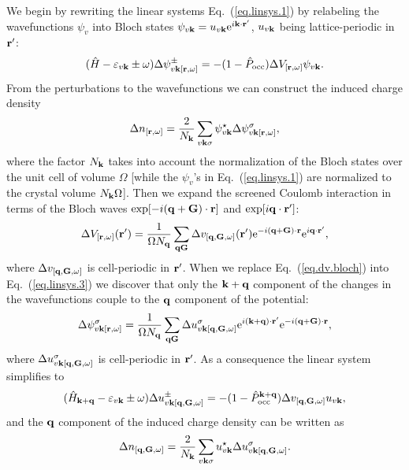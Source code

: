 \documentclass[twocolumn,prb,showpacs,superscriptaddress]{revtex4}
\def\w{\omega}
\def\H{\hat{H}}
\def\P{\hat{P}_{\rm occ}}
\def\E{\varepsilon}
\def\q{{\bf q}}
\def\s{\sigma}
\def\k{{\bf k}}
\def\G{{\bf G}}
\def\r{{\bf r}}
\def\rp{{\bf r^\prime}}
\begin{document}
We begin by rewriting 
the linear systems Eq.\ (\ref{eq.linsys.1})
by relabeling the wavefunctions $\psi_v$ into Bloch states
$\psi_{v\k}=u_{v\k} {\rm e}^{i\k\cdot\rp}$, $u_{v\k}$ being
lattice-periodic in $\rp$:
  \begin{equation}\label{eq.linsys.3}
  (\H-\E_{v\k}\pm\w) \Delta \psi^\pm_{v\k[\r,\w]}  = -(1-\P)  \Delta V_{[\r,\w]} \psi_{v\k}.
  \end{equation}
From the perturbations to the wavefunctions we can construct the
induced charge density
  \begin{equation}\label{eq.ch}
  \Delta n_{[\r,\w]} = \frac{2}{N_\k}\sum_{v\k\s} \psi_{v\k}^\star  \Delta \psi^\s_{v\k[\r,\w]},
  \end{equation}
where the factor $N_\k$ takes into account the normalization of
the Bloch states over the unit cell of volume $\Omega$
[while the $\psi_v$'s in Eq.\ (\ref{eq.linsys.1}) are normalized to the crystal volume
$N_\k \Omega$].
Then we expand the screened Coulomb interaction in terms
of the Bloch waves ${\rm exp}[-i(\q+\G)\cdot\r]$ and ${\rm exp}[i\q\cdot\rp]$:
  \begin{equation}\label{eq.dv.bloch}
  \Delta V_{[\r,\w]} (\rp) = \frac{1}{\Omega N_\q}  \sum_{\q\G} \Delta v_{[\q,\G,\w]}(\rp) 
   {\rm e}^{-i(\q+\G)\cdot\r} {\rm e}^{i\q\cdot\rp}, 
  \end{equation}
where $\Delta v_{[\q,\G,\w]}$ is cell-periodic in $\rp$.
When we replace Eq.\ (\ref{eq.dv.bloch}) into Eq.\ (\ref{eq.linsys.3})
we discover that only the $\k+\q$ component of the changes in the wavefunctions
couple to the $\q$ component of the potential:
  \begin{equation}
  \Delta \psi^\sigma_{v\k[\r,\w]} = \frac{1}{\Omega N_\q} \sum_{\q\G} \Delta u^\sigma_{v\k[\q,\G,\w]} 
  {\rm e}^{i(\k+\q)\cdot\rp} {\rm e}^{-i(\q+\G)\cdot\r},
  \end{equation}
where $\Delta u^\sigma_{v\k[\q,\G,\w]}$ is cell-periodic in $\rp$.
As a consequence the linear system simplifies to
  \begin{equation}\label{eq.linsys.4}
  (\H_{\k+\q}-\E_{v\k}\pm\w) \Delta u^\pm_{v\k[\q,\G,\w]}  = -(1-\P^{\k+\q}) \Delta v_{[\q,\G,\w]} u_{v\k},
  \end{equation}
and the $\q$ component of the induced charge density can be written as
  \begin{equation} \label{eq.deltan.bloch}
  \Delta n_{[\q,\G,\w]} = \frac{2}{N_\k}\sum_{v\k\s} u_{v\k}^\star  \Delta u^\s_{v\k[\q,\G,\w]}.
  \end{equation}
\end{document}
